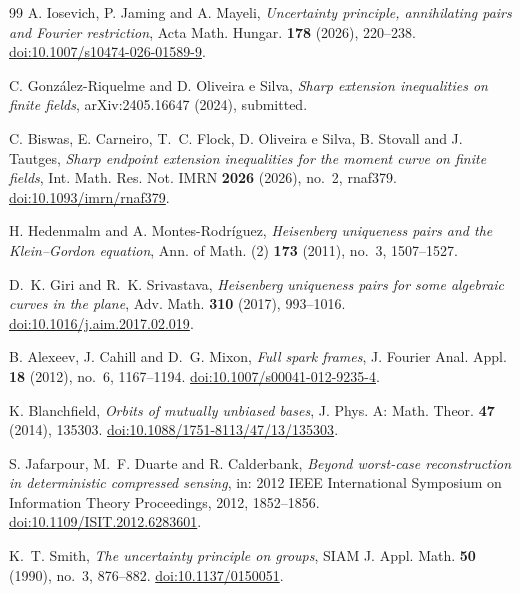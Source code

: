 \documentclass[11pt]{article}
\begin{document}
\begin{thebibliography}{99}
A. Iosevich, P. Jaming and A. Mayeli,
\emph{Uncertainty principle, annihilating pairs and Fourier restriction},
Acta Math. Hungar. \textbf{178} (2026), 220--238.
\href{https://doi.org/10.1007/s10474-026-01589-9}{doi:10.1007/s10474-026-01589-9}.

C. Gonz\'alez-Riquelme and D. Oliveira e Silva,
\emph{Sharp extension inequalities on finite fields},
arXiv:2405.16647 (2024), submitted.

C. Biswas, E. Carneiro, T.~C. Flock, D. Oliveira e Silva, B. Stovall and J. Tautges,
\emph{Sharp endpoint extension inequalities for the moment curve on finite fields},
Int. Math. Res. Not. IMRN \textbf{2026} (2026), no.~2, rnaf379.
\href{https://doi.org/10.1093/imrn/rnaf379}{doi:10.1093/imrn/rnaf379}.

H. Hedenmalm and A. Montes-Rodr\'iguez,
\emph{Heisenberg uniqueness pairs and the Klein--Gordon equation},
Ann. of Math. (2) \textbf{173} (2011), no.~3, 1507--1527.

D.~K. Giri and R.~K. Srivastava,
\emph{Heisenberg uniqueness pairs for some algebraic curves in the plane},
Adv. Math. \textbf{310} (2017), 993--1016.
\href{https://doi.org/10.1016/j.aim.2017.02.019}{doi:10.1016/j.aim.2017.02.019}.

B. Alexeev, J. Cahill and D.~G. Mixon,
\emph{Full spark frames},
J. Fourier Anal. Appl. \textbf{18} (2012), no.~6, 1167--1194.
\href{https://doi.org/10.1007/s00041-012-9235-4}{doi:10.1007/s00041-012-9235-4}.

K. Blanchfield,
\emph{Orbits of mutually unbiased bases},
J. Phys. A: Math. Theor. \textbf{47} (2014), 135303.
\href{https://doi.org/10.1088/1751-8113/47/13/135303}{doi:10.1088/1751-8113/47/13/135303}.

S. Jafarpour, M.~F. Duarte and R. Calderbank,
\emph{Beyond worst-case reconstruction in deterministic compressed sensing},
in: 2012 IEEE International Symposium on Information Theory Proceedings,
2012, 1852--1856.
\href{https://doi.org/10.1109/ISIT.2012.6283601}{doi:10.1109/ISIT.2012.6283601}.



K.~T. Smith,
\emph{The uncertainty principle on groups},
SIAM J. Appl. Math. \textbf{50} (1990), no.~3, 876--882.
\href{https://doi.org/10.1137/0150051}{doi:10.1137/0150051}.


\end{thebibliography}
\end{document}
